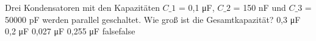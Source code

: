     {Drei Kondensatoren mit den Kapazitäten $C\_1$ = 0,1 μF, $C\_2$ = 150 nF und $C\_3$ = 50000 pF werden parallel geschaltet. Wie groß ist die Gesamtkapazität?}
    {0,3 μF}
    {0,2 μF}
    {0,027 μF}
    {0,255 μF}
    {false}{false}